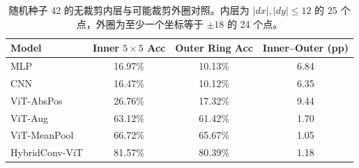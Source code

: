 \begin{table}[H]
  \centering
  \caption{随机种子 42 的无裁剪内层与可能裁剪外圈对照。内层为 $|dx|,|dy|\leq12$ 的 25 个点，外圈为至少一个坐标等于 $\pm18$ 的 24 个点。}
  \label{tab:clipping-effect}
  \renewcommand{\arraystretch}{1.12}
  \begin{tabular}{lccc}
    \toprule
    Model & Inner $5\times5$ Acc & Outer Ring Acc & Inner--Outer (pp) \\
    \midrule
    MLP & 16.97\% & 10.13\% & 6.84 \\
    CNN & 16.47\% & 10.12\% & 6.35 \\
    ViT-AbsPos & 26.76\% & 17.32\% & 9.44 \\
    ViT-Aug & 63.12\% & 61.42\% & 1.70 \\
    ViT-MeanPool & 66.72\% & 65.67\% & 1.05 \\
    HybridConv-ViT & 81.57\% & 80.39\% & 1.18 \\
    \bottomrule
  \end{tabular}
\end{table}

